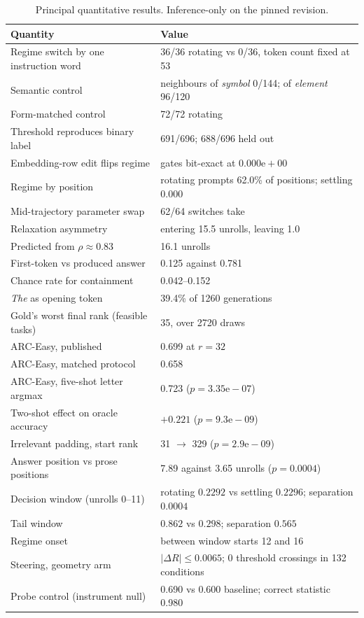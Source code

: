 \documentclass{zapiski}
\begin{document}
\begin{table}[H]
\centering
\small
\caption{Principal quantitative results. Inference-only on the pinned revision.}
\begin{tabularx}{\linewidth}{@{}lX@{}}
\toprule
\textbf{Quantity} & \textbf{Value} \\
\midrule
Regime switch by one instruction word & 36/36 rotating vs 0/36, token count fixed at 53 \\
Semantic control & neighbours of \emph{symbol} 0/144; of \emph{element} 96/120 \\
Form-matched control & 72/72 rotating \\
Threshold reproduces binary label & 691/696; 688/696 held out \\
Embedding-row edit flips regime & gates bit-exact at $0.000\mathrm{e}{+}00$ \\
Regime by position & rotating prompts 62.0\% of positions; settling 0.000 \\
Mid-trajectory parameter swap & 62/64 switches take \\
Relaxation asymmetry & entering 15.5 unrolls, leaving 1.0 \\
Predicted from $\rho \approx 0.83$ & 16.1 unrolls \\
First-token vs produced answer & 0.125 against 0.781 \\
Chance rate for containment & 0.042--0.152 \\
\emph{The} as opening token & 39.4\% of 1260 generations \\
Gold's worst final rank (feasible tasks) & 35, over 2720 draws \\
ARC-Easy, published & 0.699 at $r = 32$ \\
ARC-Easy, matched protocol & 0.658 \\
ARC-Easy, five-shot letter argmax & 0.723 ($p = 3.35\mathrm{e}{-}07$) \\
Two-shot effect on oracle accuracy & $+0.221$ ($p = 9.3\mathrm{e}{-}09$) \\
Irrelevant padding, start rank & 31 $\rightarrow$ 329 ($p = 2.9\mathrm{e}{-}09$) \\
Answer position vs prose positions & 7.89 against 3.65 unrolls ($p = 0.0004$) \\
Decision window (unrolls 0--11) & rotating $0.2292$ vs settling $0.2296$; separation $0.0004$ \\
Tail window & $0.862$ vs $0.298$; separation $0.565$ \\
Regime onset & between window starts 12 and 16 \\
Steering, geometry arm & $|\Delta R| \le 0.0065$; 0 threshold crossings in 132 conditions \\
Probe control (instrument null) & 0.690 vs 0.600 baseline; correct statistic 0.980 \\
\bottomrule
\end{tabularx}
\end{table}
\end{document}
